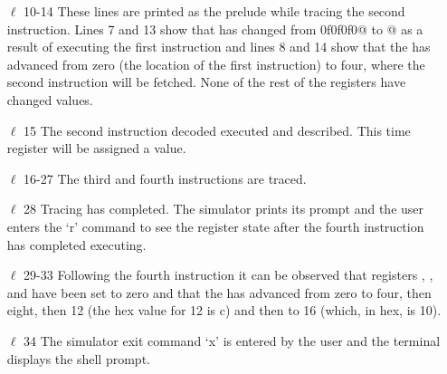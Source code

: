 \begin{itemize}
\item [$\ell$ 10-14] These lines are printed as the prelude while tracing the
	second instruction. Lines 7 and 13 show that  has changed
	from \verb@f0f0f0f0@ to @ as a result of executing the
	first instruction and lines 8 and 14 show that the  has
	advanced from zero (the location of the first instruction) to
	four, where the second instruction will be fetched.  None of the
	rest of the registers have changed values.
\item [$\ell$ 15] The second instruction decoded executed and described.
	This time register  will be assigned a value.
\item [$\ell$ 16-27] The third and fourth instructions are traced.
\item [$\ell$ 28] Tracing has completed. The simulator prints its prompt
	and the user enters the `r' command to see the register state
	after the fourth instruction has completed executing.
\item [$\ell$ 29-33] Following the fourth instruction it can be observed
	that registers , ,  and 
	have been set to zero and that the  has advanced from
	zero to four, then eight, then 12 (the hex value for 12 is c)
	and then to 16 (which, in hex, is 10).
\item [$\ell$ 34] The simulator exit command `x' is entered by the user and
	the terminal displays the shell prompt.

\end{itemize}